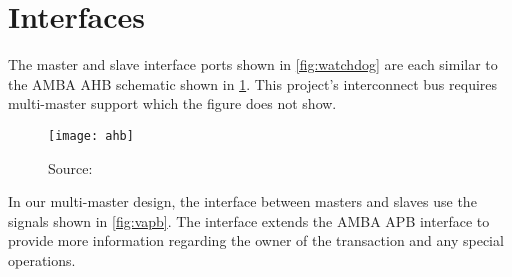 \section{Interfaces}
The master and slave interface ports shown in \cref{fig:watchdog} are each similar to the AMBA AHB schematic shown in \cref{fig:ahb}. This project's interconnect bus requires multi-master support which the figure does not show.

\begin{figure}[H]
\centering
\texttt{[image: ahb]}
\caption{Source: \cite{armahb}}
\label{fig:ahb}
\end{figure}

In our multi-master design, the interface between masters and slaves use the signals shown in \cref{fig:vapb}. The interface extends the AMBA APB interface to provide more information regarding the owner of the transaction and any special operations.

